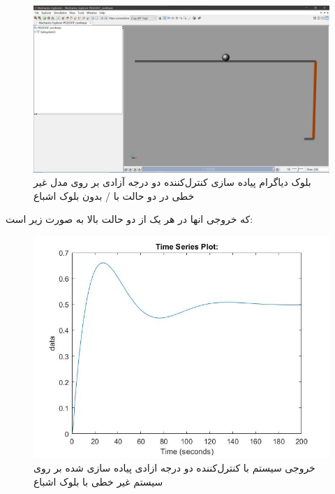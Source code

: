 \begin{figure}[H]
	\centering
	\includegraphics[width=12cm]{../Figure/P_V/PID_2DOF_nonlinear_simmechanic.jpg}
	\caption{بلوک دیاگرام پیاده سازی کنترل‌کننده دو درجه آزادی بر روی مدل غیر خطی در دو حالت با / بدون بلوک اشباع}
\end{figure}



که خروجی انها در هر یک از دو حالت بالا به صورت زیر است:
%
\begin{figure}[H]
	\centering
	\includegraphics[width=12cm]{../Figure/P_V/PID_2DOF_OUTPUT_WITH_SATURATIO.jpg}
	\caption{خروجی سیستم با کنترل‌کننده دو درجه ازادی پیاده سازی شده بر روی سیستم غیر خطی با بلوک اشباع}
\end{figure}

